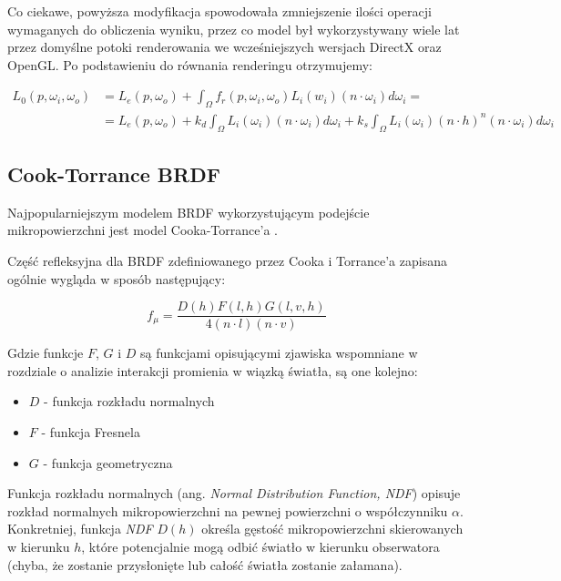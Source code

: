 \documentclass[../main.tex]{subfiles}
\begin{document}
Co ciekawe, powyższa modyfikacja spowodowała zmniejszenie ilości operacji
wymaganych do obliczenia wyniku, przez co model był wykorzystywany wiele lat
przez domyślne potoki renderowania we wcześniejszych wersjach DirectX oraz
OpenGL. Po podstawieniu do równania renderingu otrzymujemy:

\begin{align*}
  L_0(p, \omega_i, \omega_o) &=
  L_{e}(p, \omega_o) +
  \int_{\Omega} {
    f_r(p, \omega_i, \omega_o)
    L_i(w_i)
    (n \cdot \omega_i)
    d \omega_i
  } = \\
  &= L_{e}(p, \omega_o) +
  k_d \int_{\Omega} {L_i(\omega_i) (n \cdot \omega_i) d\omega_i} +
  k_s \int_{\Omega} {L_i(\omega_i) (n \cdot h)^{n} (n \cdot \omega_i) d\omega_i}
\end{align*}

\subsection{Cook-Torrance BRDF}

Najpopularniejszym 
modelem BRDF wykorzystującym podejście mikropowierzchni jest model
Cooka-Torrance'a \cite{CookTorrance}.

Część refleksyjna dla BRDF zdefiniowanego przez Cooka i Torrance'a zapisana
ogólnie wygląda w sposób następujący:

\begin{displaymath}
  f_{\mu} = \frac{
    D(h) F(l,h) G(l,v,h)
  }{
    4 (n \cdot l) (n \cdot v)
  }
\end{displaymath}

Gdzie funkcje $F$, $G$ i $D$ są funkcjami opisującymi zjawiska wspomniane
w rozdziale o analizie interakcji promienia w wiązką światła, są one kolejno:

\begin{itemize}
  \item $D$ - funkcja rozkładu normalnych
  \item $F$ - funkcja Fresnela
  \item $G$ - funkcja geometryczna
\end{itemize}

Funkcja rozkładu normalnych (ang. \textit{Normal Distribution Function, NDF})
opisuje rozkład normalnych mikropowierzchni na pewnej powierzchni o
współczynniku $\alpha$. Konkretniej, funkcja \textit{NDF} $D(h)$ określa
gęstość mikropowierzchni skierowanych w kierunku $h$, które potencjalnie mogą
odbić światło w kierunku obserwatora (chyba, że zostanie przysłonięte lub
całość światła zostanie załamana).
\end{document}
